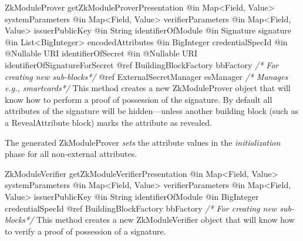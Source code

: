       \begin{method}
      {ZkModuleProver}
      {getZkModuleProverPresentation}
      {
        {@in Map<Field, Value> systemParameters}
        {@in Map<Field, Value> verifierParameters}
        {@in Map<Field, Value> issuerPublicKey}
        {@in String identifierOfModule}
        {@in Signature signature}
        {@in List<BigInteger> encodedAttributes}
        {@in BigInteger credentialSpecId}
        {@in @Nullable URI identifierOfSecret}
        {@in @Nullable URI identifierOfSignatureForSecret}
        {@ref BuildingBlockFactory bbFactory \textrm{\emph{/* For creating new sub-blocks*/}}}
        {@ref ExternalSecretManager esManager \textrm{\emph{/* Manages e.g., smartcards*/}}}
      }
      This method creates a new ZkModuleProver object that will know how to perform
      a proof of possession of the signature.
      By default all attributes of the signature will be hidden---unless another
      building block (such as a RevealAttribute block) marks the
      attribute as revealed.

      The generated ZkModuleProver \emph{sets} the attribute values in the \emph{initialization} phase
      for all non-external attributes.
      \end{method}
      \begin{method}
      {ZkModuleVerifier}
      {getZkModuleVerifierPresentation}
      {
        {@in Map<Field, Value> systemParameters}
        {@in Map<Field, Value> verifierParameters}
        {@in Map<Field, Value> issuerPublicKey}
        {@in String identifierOfModule}
        {@in BigInteger credentialSpecId}
        {@ref BuildingBlockFactory bbFactory \textrm{\emph{/* For creating new sub-blocks*/}}}
      }
      This method creates a new ZkModuleVerifier object that will know how to verify
      a proof of possession of a signature.
      \end{method}
